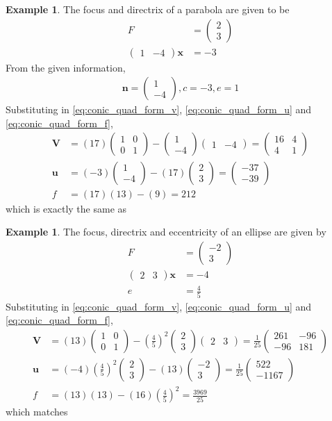 \documentclass[]{interact}
\theoremstyle{plain}%
\theoremstyle{definition}
\newtheorem{example}[theorem]{Example}
\theoremstyle{remark}
\providecommand{\brak}[1]{\ensuremath{\left(#1\right)}}
\newcommand{\myvec}[1]{\ensuremath{\begin{pmatrix}#1\end{pmatrix}}}
\let\vec\mathbf
\begin{document}
\begin{example}
  \label{parab_ex1}
  The focus and  directrix of a parabola are given to be 
  \begin{align}
    \label{parab_ex1_F}
F &= \myvec{2\\3}
\\
\label{parab_ex1_nc}
\myvec{1 & -4}\vec{x} &= -3
  \end{align}
  From the given information,
  \begin{align}
    \vec{n} = \myvec{1\\-4}, c = -3, e = 1 
  \end{align}
Substituting in  \eqref{eq:conic_quad_form_v},  \eqref{eq:conic_quad_form_u} and  \eqref{eq:conic_quad_form_f},
\begin{align}
  \label{parab_ex1_V}
  \vec{V} &= (17)\myvec{1 & 0 \\ 0 & 1} - \myvec{1\\-4}\myvec{1 & -4} = \myvec{16 &  4 \\  4 & 1}
  \\
  \label{parab_ex1_u}
  \vec{u} &= (-3) \myvec{1\\-4}-(17)\myvec{2\\3} = \myvec{-37\\-39}
  \\
  \label{parab_ex1_f}
  f &= (17)(13)-(9) = 212
  \end{align}
which is exactly the same as \cite[Article 199, p. 176]{loney_coord}
\end{example}
%
\begin{example}
  \label{ellipse_ex1}
  The focus,  directrix and eccentricity of an ellipse  are given by 
  \begin{align}
    \label{ellipse_ex1_F}
F &= \myvec{-2\\3}
\\
\label{ellipse_ex1_nc}
\myvec{2 & 3}\vec{x} &= -4
\\
\label{ellipse_ex1_e}
e &= \frac{4}{5}
  \end{align}
  Substituting in  \eqref{eq:conic_quad_form_v},  \eqref{eq:conic_quad_form_u} and  \eqref{eq:conic_quad_form_f},
  \begin{align}
    \label{ellipse_ex1_V}
    \vec{V} &= (13)\myvec{1 & 0 \\ 0 & 1} -\brak{\frac{4}{5}}^2 \myvec{2\\3}\myvec{2 & 3} = \frac{1}{25}\myvec{261 & -96\\-96 & 181}
    \\
    \label{ellipse_ex1_u}
    \vec{u} &= (-4) \brak{\frac{4}{5}}^2\myvec{2\\3}-(13)\myvec{-2\\3} = \frac{1}{25}\myvec{ 522\\-1167}
    \\
    \label{ellipse_ex1_f}
    f &= (13)(13)-(16)\brak{\frac{4}{5}}^2 =\frac{3969}{25}
    \end{align}
  which matches \cite[Article 249, p. 227]{loney_coord}
  \end{example}
  
\end{document}
